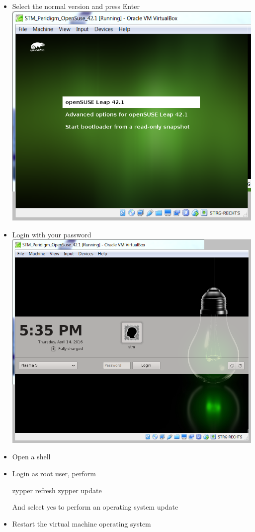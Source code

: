 \begin{enumerate}[noitemsep]
\begin{itemize}
   \item Select the normal version and press Enter\\
   \includegraphics[scale=0.25]{Figures/VirtualBox_VirtualMachine_OperatingSystem_Boot_Version}
   \item Login with your password\\
   \includegraphics[scale=0.25]{Figures/VirtualBox_VirtualMachine_OperatingSystem_Login}
   \item Open a shell
   \item Login as root user, perform
\begin{code}
zypper refresh
zypper update
\end{code}
   And select yes to perform an operating system update
   \item Restart the virtual machine operating system
 \end{itemize}
\end{enumerate}

